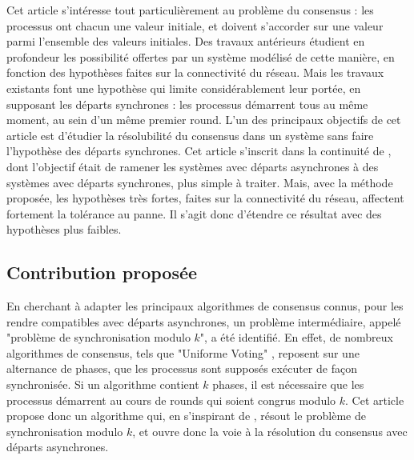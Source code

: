 \documentclass{article}
\begin{document}
Cet article s'intéresse tout particulièrement au problème du consensus : les processus ont chacun une valeur initiale, et doivent s'accorder sur une valeur parmi l'ensemble des valeurs initiales.
Des travaux antérieurs étudient en profondeur les possibilité offertes par un système modélisé de cette manière, en fonction des hypothèses faites sur la connectivité du réseau.
Mais les travaux existants font une hypothèse qui limite considérablement leur portée, en supposant les départs synchrones : les processus démarrent tous au même moment, au sein d'un même premier round.
L'un des principaux objectifs de cet article est d'étudier la résolubilité du consensus dans un système sans faire l'hypothèse des départs synchrones.
Cet article s'inscrit dans la continuité de \cite{firing_squad}, dont l'objectif était de ramener les systèmes avec départs asynchrones à des systèmes avec départs synchrones, plus simple à traiter.
Mais, avec la méthode proposée, les hypothèses très fortes, faites sur la connectivité du réseau, affectent fortement la tolérance au panne.
Il s'agit donc d'étendre ce résultat avec des hypothèses plus faibles.

\subsection{Contribution proposée}

En cherchant à adapter les principaux algorithmes de consensus connus,
pour les rendre compatibles avec départs asynchrones, un problème intermédiaire, appelé "problème de synchronisation modulo $k$", a été identifié.
En effet, de nombreux algorithmes de consensus, tels que "Uniforme Voting" \cite{model_ho}, reposent sur une alternance de phases, que les processus sont supposés exécuter de façon synchronisée.
Si un algorithme contient $k$ phases, il est nécessaire que les processus démarrent au cours de rounds qui soient congrus modulo $k$.
Cet article propose donc un algorithme qui, en s'inspirant de \cite{firing_squad},
résout le problème de synchronisation modulo $k$, et ouvre donc la voie à la résolution du consensus avec départs asynchrones.
\end{document}
